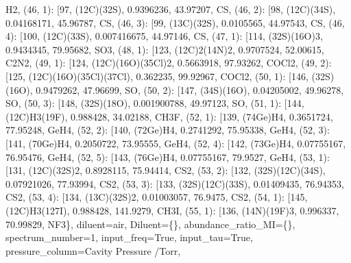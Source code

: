 \documentclass[letterpaper,10pt,english]{sphinxmanual}
\begin{document}
\begin{fulllineitems}
\textquotesingle{}H2\textquotesingle{}{]}, (46, 1): {[}97, \textquotesingle{}(12C)(32S)\textquotesingle{}, 0.9396236, 43.97207, \textquotesingle{}CS\textquotesingle{}{]}, (46, 2): {[}98, \textquotesingle{}(12C)(34S)\textquotesingle{}, 0.04168171, 45.96787, \textquotesingle{}CS\textquotesingle{}{]}, (46, 3): {[}99, \textquotesingle{}(13C)(32S)\textquotesingle{}, 0.0105565, 44.97543, \textquotesingle{}CS\textquotesingle{}{]}, (46, 4): {[}100, \textquotesingle{}(12C)(33S)\textquotesingle{}, 0.007416675, 44.97146, \textquotesingle{}CS\textquotesingle{}{]}, (47, 1): {[}114, \textquotesingle{}(32S)(16O)3\textquotesingle{}, 0.9434345, 79.95682, \textquotesingle{}SO3\textquotesingle{}{]}, (48, 1): {[}123, \textquotesingle{}(12C)2(14N)2\textquotesingle{}, 0.9707524, 52.00615, \textquotesingle{}C2N2\textquotesingle{}{]}, (49, 1): {[}124, \textquotesingle{}(12C)(16O)(35Cl)2\textquotesingle{}, 0.5663918, 97.93262, \textquotesingle{}COCl2\textquotesingle{}{]}, (49, 2): {[}125, \textquotesingle{}(12C)(16O)(35Cl)(37Cl)\textquotesingle{}, 0.362235, 99.92967, \textquotesingle{}COCl2\textquotesingle{}{]}, (50, 1): {[}146, \textquotesingle{}(32S)(16O)\textquotesingle{}, 0.9479262, 47.96699, \textquotesingle{}SO\textquotesingle{}{]}, (50, 2): {[}147, \textquotesingle{}(34S)(16O)\textquotesingle{}, 0.04205002, 49.96278, \textquotesingle{}SO\textquotesingle{}{]}, (50, 3): {[}148, \textquotesingle{}(32S)(18O)\textquotesingle{}, 0.001900788, 49.97123, \textquotesingle{}SO\textquotesingle{}{]}, (51, 1): {[}144, \textquotesingle{}(12C)H3(19F)\textquotesingle{}, 0.988428, 34.02188, \textquotesingle{}CH3F\textquotesingle{}{]}, (52, 1): {[}139, \textquotesingle{}(74Ge)H4\textquotesingle{}, 0.3651724, 77.95248, \textquotesingle{}GeH4\textquotesingle{}{]}, (52, 2): {[}140, \textquotesingle{}(72Ge)H4\textquotesingle{}, 0.2741292, 75.95338, \textquotesingle{}GeH4\textquotesingle{}{]}, (52, 3): {[}141, \textquotesingle{}(70Ge)H4\textquotesingle{}, 0.2050722, 73.95555, \textquotesingle{}GeH4\textquotesingle{}{]}, (52, 4): {[}142, \textquotesingle{}(73Ge)H4\textquotesingle{}, 0.07755167, 76.95476, \textquotesingle{}GeH4\textquotesingle{}{]}, (52, 5): {[}143, \textquotesingle{}(76Ge)H4\textquotesingle{}, 0.07755167, 79.9527, \textquotesingle{}GeH4\textquotesingle{}{]}, (53, 1): {[}131, \textquotesingle{}(12C)(32S)2\textquotesingle{}, 0.8928115, 75.94414, \textquotesingle{}CS2\textquotesingle{}{]}, (53, 2): {[}132, \textquotesingle{}(32S)(12C)(34S)\textquotesingle{}, 0.07921026, 77.93994, \textquotesingle{}CS2\textquotesingle{}{]}, (53, 3): {[}133, \textquotesingle{}(32S)(12C)(33S)\textquotesingle{}, 0.01409435, 76.94353, \textquotesingle{}CS2\textquotesingle{}{]}, (53, 4): {[}134, \textquotesingle{}(13C)(32S)2\textquotesingle{}, 0.01003057, 76.9475, \textquotesingle{}CS2\textquotesingle{}{]}, (54, 1): {[}145, \textquotesingle{}(12C)H3(127I)\textquotesingle{}, 0.988428, 141.9279, \textquotesingle{}CH3I\textquotesingle{}{]}, (55, 1): {[}136, \textquotesingle{}(14N)(19F)3\textquotesingle{}, 0.996337, 70.99829, \textquotesingle{}NF3\textquotesingle{}{]}\}, diluent=\textquotesingle{}air\textquotesingle{}, Diluent=\{\}, abundance\_ratio\_MI=\{\}, spectrum\_number=1, input\_freq=True, input\_tau=True, pressure\_column=\textquotesingle{}Cavity Pressure /Torr\textquotesingle{}, 
\end{fulllineitems}
\end{document}
